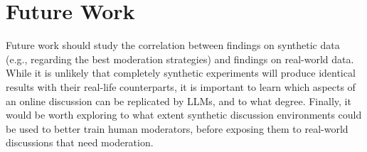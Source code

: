 \section{Future Work}

Future work should study the correlation between findings on synthetic data (e.g., regarding the best moderation strategies) and findings on real-world data. While it is unlikely that completely synthetic experiments will produce identical results with their real-life counterparts, it is important to learn which aspects of an online discussion can be replicated by \acp{LLM}, and to what degree. Finally, it would be worth exploring to what extent synthetic discussion environments could be used to better train human moderators, before exposing them to real-world discussions that need moderation.